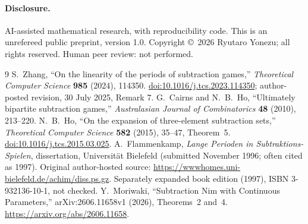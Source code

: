 \documentclass[10pt,a4paper]{article}
\begin{document}
\paragraph{Disclosure.} AI-assisted mathematical research, with reproducibility code. This is an unrefereed public preprint, version 1.0. Copyright \copyright\ 2026 Ryutaro Yonezu; all rights reserved. Human peer review: not performed.
\begin{thebibliography}{9}
 S.~Zhang, ``On the linearity of the periods of subtraction games,'' \emph{Theoretical Computer Science} \textbf{985} (2024), 114350. \href{https://doi.org/10.1016/j.tcs.2023.114350}{doi:10.1016/j.tcs.2023.114350}; author-posted revision, 30 July 2025, Remark 7.
 G.~Cairns and N.~B.~Ho, ``Ultimately bipartite subtraction games,'' \emph{Australasian Journal of Combinatorics} \textbf{48} (2010), 213--220.
 N.~B.~Ho, ``On the expansion of three-element subtraction sets,'' \emph{Theoretical Computer Science} \textbf{582} (2015), 35--47, Theorem~5. \href{https://doi.org/10.1016/j.tcs.2015.03.025}{doi:10.1016/j.tcs.2015.03.025}.
 A.~Flammenkamp, \emph{Lange Perioden in Subtraktions-Spielen}, dissertation, Universit\"at Bielefeld (submitted November 1996; often cited as 1997). Original author-hosted source: \url{https://wwwhomes.uni-bielefeld.de/achim/diss.ps.gz}. Separately expanded book edition (1997), ISBN 3-932136-10-1, not checked.
 Y.~Moriwaki, ``Subtraction Nim with Continuous Parameters,'' arXiv:2606.11658v1 (2026), Theorems~2 and~4. \url{https://arxiv.org/abs/2606.11658}.
\end{thebibliography}
\end{document}

